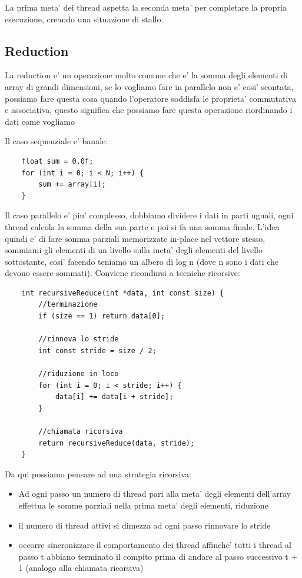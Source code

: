 La prima meta' dei thread aspetta la seconda meta' per completare la propria esecuzione, creando una situazione di stallo.

\subsection{Reduction}
La reduction e' un operazione molto comune che e' la somma degli elementi di array di grandi dimensioni, se lo vogliamo fare in parallelo non e' cosi' scontata, possiamo fare questa cosa quando l'operatore soddisfa le proprieta' commutativa e associativa, questo significa che possiamo fare questa operazione riordinando i dati come vogliamo

Il caso sequenziale e' banale:
\begin{lstlisting}
    float sum = 0.0f;
    for (int i = 0; i < N; i++) {
        sum += array[i];
    }
\end{lstlisting}

Il caso parallelo e' piu' complesso, dobbiamo dividere i dati in parti uguali, ogni thread calcola la somma della sua parte e poi si fa una somma finale. L'idea quindi e' di fare somma parziali memorizzate in-place nel vettore stesso, sommiami gli elementi di un livello sulla meta' degli elementi del livello sottostante, cosi' facendo teniamo un albero di log n (dove n sono i dati che devono essere sommati).
Conviene ricondursi a tecniche ricorsive:
\begin{lstlisting}
    int recursiveReduce(int *data, int const size) {
        //terminazione
        if (size == 1) return data[0];

        //rinnova lo stride
        int const stride = size / 2;

        //riduzione in loco
        for (int i = 0; i < stride; i++) {
            data[i] += data[i + stride];
        }

        //chiamata ricorsiva
        return recursiveReduce(data, stride);
    }
\end{lstlisting}

Da qui possiamo pensare ad una strategia ricorsiva:
\begin{itemize}
    \item Ad ogni passo un numero di thread pari alla meta' degli elementi dell'array effettua le somme parziali nella prima meta' degli elementi, riduzione
    \item il numero di thread attivi si dimezza ad ogni passo rinnovare lo stride
    \item occorre sincronizzare il comportamento dei thread affinche' tutti i thread al passo t abbiano terminato il compito prima di andare al passo successivo t + 1 (analogo alla chiamata ricorsiva)
\end{itemize}

